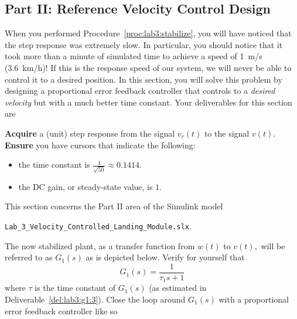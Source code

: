 \subsection{Part II: Reference Velocity Control Design}\label{Lab:3:Part:II}
When you performed Procedure~\ref{proc:lab3:stabilize}, you will have noticed that the step response was extremely slow.
In particular, you should notice that it took more than a minute of simulated time to achieve a speed of \SI{1}{m/s} (\SI{3.6}{km/h})!
If this is the response speed of our system, we will never be able to control it to a desired position.
In this section, you will solve this problem by designing a proportional error feedback controller that controls to a \emph{desired velocity} but with a much better time constant.
Your deliverables for this section are
%
\begin{deliverable}[label={del:lab3:g2:1}]
  \textbf{Acquire} a (unit) step response from the signal \(v_r(t)\) to the signal \(v(t).\)
  \textbf{Ensure} you have cursors that indicate the following:
  \begin{itemize}
    \item{the time constant is \(\frac{1}{\sqrt{50}} \approx 0.1414.\)}
    \item{the DC gain, or steady-state value, is \(1.\)}
  \end{itemize}
\end{deliverable}
%
This section concerns the Part II area of the Simulink model
\begin{center}
  \texttt{Lab\_3\_Velocity\_Controlled\_Landing\_Module.slx}.
\end{center}
The now stabilized plant, as a transfer function from \(w(t)\) to \(v(t),\) will be referred to as \(G_1(s)\) as is depicted below.
Verify for yourself that
\[
  G_1(s) = \frac{1}{\tau_1 s + 1}
\]
where \(\tau\) is the time constant of \(G_1(s)\) (as estimated in Deliverable~\ref{del:lab3:g1:3}).
Close the loop around \(G_1(s)\) with a proportional error feedback controller like so
%
